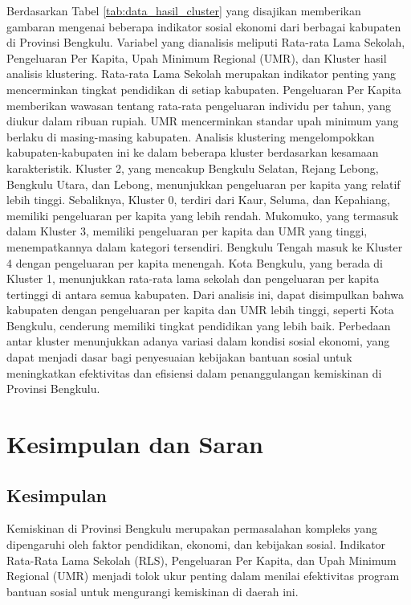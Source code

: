 \documentclass[12pt,a4paper]{article}
\begin{document}
\begin{multicols}{2}
Berdasarkan Tabel \ref{tab:data_hasil_cluster} yang disajikan memberikan gambaran mengenai beberapa indikator sosial ekonomi dari berbagai kabupaten di Provinsi Bengkulu. Variabel yang dianalisis meliputi Rata-rata Lama Sekolah, Pengeluaran Per Kapita, Upah Minimum Regional (UMR), dan Kluster hasil analisis klustering. Rata-rata Lama Sekolah merupakan indikator penting yang mencerminkan tingkat pendidikan di setiap kabupaten. Pengeluaran Per Kapita memberikan wawasan tentang rata-rata pengeluaran individu per tahun, yang diukur dalam ribuan rupiah. UMR mencerminkan standar upah minimum yang berlaku di masing-masing kabupaten. Analisis klustering mengelompokkan kabupaten-kabupaten ini ke dalam beberapa kluster berdasarkan kesamaan karakteristik. Kluster 2, yang mencakup Bengkulu Selatan, Rejang Lebong, Bengkulu Utara, dan Lebong, menunjukkan pengeluaran per kapita yang relatif lebih tinggi. Sebaliknya, Kluster 0, terdiri dari Kaur, Seluma, dan Kepahiang, memiliki pengeluaran per kapita yang lebih rendah. Mukomuko, yang termasuk dalam Kluster 3, memiliki pengeluaran per kapita dan UMR yang tinggi, menempatkannya dalam kategori tersendiri. Bengkulu Tengah masuk ke Kluster 4 dengan pengeluaran per kapita menengah. Kota Bengkulu, yang berada di Kluster 1, menunjukkan rata-rata lama sekolah dan pengeluaran per kapita tertinggi di antara semua kabupaten. Dari analisis ini, dapat disimpulkan bahwa kabupaten dengan pengeluaran per kapita dan UMR lebih tinggi, seperti Kota Bengkulu, cenderung memiliki tingkat pendidikan yang lebih baik. Perbedaan antar kluster menunjukkan adanya variasi dalam kondisi sosial ekonomi, yang dapat menjadi dasar bagi penyesuaian kebijakan bantuan sosial untuk meningkatkan efektivitas dan efisiensi dalam penanggulangan kemiskinan di Provinsi Bengkulu.


\section{Kesimpulan dan Saran}

\subsection{Kesimpulan}

Kemiskinan di Provinsi Bengkulu merupakan permasalahan kompleks yang dipengaruhi oleh faktor pendidikan, ekonomi, dan kebijakan sosial. Indikator Rata-Rata Lama Sekolah (RLS), Pengeluaran Per Kapita, dan Upah Minimum Regional (UMR) menjadi tolok ukur penting dalam menilai efektivitas program bantuan sosial untuk mengurangi kemiskinan di daerah ini. 


\end{multicols}
\end{document}
